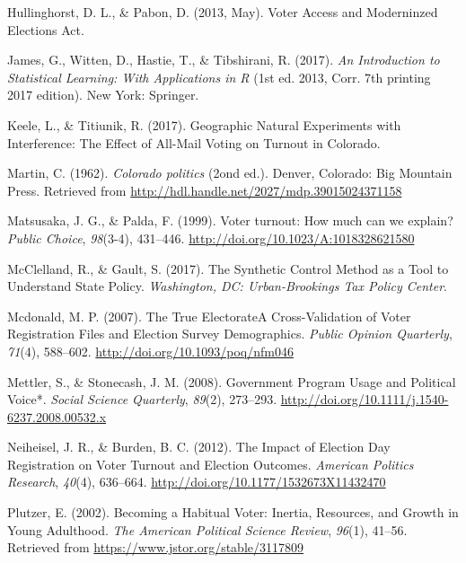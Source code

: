 \documentclass[12pt,twoside]{reedthesis}
\begin{document}
  \hypertarget{ref-hullinghorst_voter_2013}{}
  Hullinghorst, D. L., \& Pabon, D. (2013, May). Voter Access and
  Moderninzed Elections Act.
  
  \hypertarget{ref-james_introduction_2017}{}
  James, G., Witten, D., Hastie, T., \& Tibshirani, R. (2017). \emph{An
  Introduction to Statistical Learning: With Applications in R} (1st ed.
  2013, Corr. 7th printing 2017 edition). New York: Springer.
  
  \hypertarget{ref-keele_geographic_2017}{}
  Keele, L., \& Titiunik, R. (2017). Geographic Natural Experiments with
  Interference: The Effect of All-Mail Voting on Turnout in Colorado.
  
  \hypertarget{ref-martin_colorado_1962}{}
  Martin, C. (1962). \emph{Colorado politics} (2ond ed.). Denver,
  Colorado: Big Mountain Press. Retrieved from
  \url{http://hdl.handle.net/2027/mdp.39015024371158}
  
  \hypertarget{ref-matsusaka_voter_1999}{}
  Matsusaka, J. G., \& Palda, F. (1999). Voter turnout: How much can we
  explain? \emph{Public Choice}, \emph{98}(3-4), 431--446.
  \url{http://doi.org/10.1023/A:1018328621580}
  
  \hypertarget{ref-mcclelland_synthetic_2017}{}
  McClelland, R., \& Gault, S. (2017). The Synthetic Control Method as a
  Tool to Understand State Policy. \emph{Washington, DC: Urban-Brookings
  Tax Policy Center}.
  
  \hypertarget{ref-mcdonald_true_2007}{}
  Mcdonald, M. P. (2007). The True ElectorateA Cross-Validation of Voter
  Registration Files and Election Survey Demographics. \emph{Public
  Opinion Quarterly}, \emph{71}(4), 588--602.
  \url{http://doi.org/10.1093/poq/nfm046}
  
  \hypertarget{ref-mettler_government_2008}{}
  Mettler, S., \& Stonecash, J. M. (2008). Government Program Usage and
  Political Voice*. \emph{Social Science Quarterly}, \emph{89}(2),
  273--293. \url{http://doi.org/10.1111/j.1540-6237.2008.00532.x}
  
  \hypertarget{ref-neiheisel_impact_2012}{}
  Neiheisel, J. R., \& Burden, B. C. (2012). The Impact of Election Day
  Registration on Voter Turnout and Election Outcomes. \emph{American
  Politics Research}, \emph{40}(4), 636--664.
  \url{http://doi.org/10.1177/1532673X11432470}
  
  \hypertarget{ref-plutzer_becoming_2002}{}
  Plutzer, E. (2002). Becoming a Habitual Voter: Inertia, Resources, and
  Growth in Young Adulthood. \emph{The American Political Science Review},
  \emph{96}(1), 41--56. Retrieved from
  \url{https://www.jstor.org/stable/3117809}
  
\end{document}
